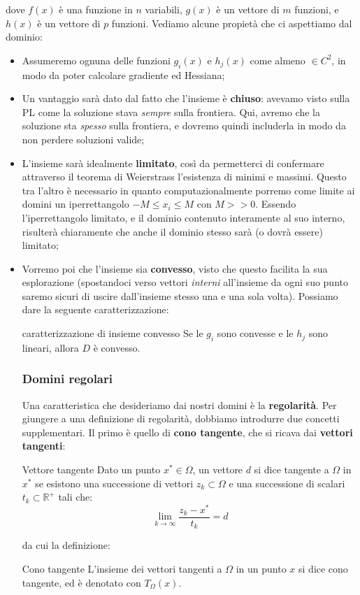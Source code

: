 \documentclass[a4paper,11pt]{article}
\begin{document}
dove $f(x)$ è una funzione in $n$ variabili, $g(x)$ è un vettore di $m$ funzioni, e $h(x)$ è un vettore di $p$ funzioni.
Vediamo alcune propietà che ci aspettiamo dal dominio:
\begin{itemize}
	\item Assumeremo ognuna delle funzioni $g_i(x)$ e $h_j(x)$ come almeno $\in C^2$, in modo da poter calcolare gradiente ed Hessiana;
	\item Un vantaggio sarà dato dal fatto che l'insieme è \textbf{chiuso}: avevamo visto sulla PL come la soluzione stava \textit{sempre} sulla frontiera. Qui, avremo che la soluzione sta \textit{spesso} sulla frontiera, e dovremo quindi includerla in modo da non perdere soluzioni valide;
	\item L'insieme sarà idealmente \textbf{limitato}, così da permetterci di confermare attraverso il teorema di Weierstrass l'esistenza di minimi e massimi.
Questo tra l'altro è necessario in quanto computazionalmente porremo come limite ai domini un iperrettangolo $-M \leq x_i \leq M$ con $M >> 0$.
Essendo l'iperrettangolo limitato, e il dominio contenuto interamente al suo interno, risulterà chiaramente che anche il dominio stesso sarà (o dovrà essere) limitato;
\item Vorremo poi che l'insieme sia \textbf{convesso}, visto che questo facilita la sua esplorazione (spostandoci verso vettori \textit{interni} all'insieme da ogni suo punto saremo sicuri di uscire dall'insieme stesso una e una sola volta).
	Possiamo dare la seguente caratterizzazione:
	\begin{theorem}{caratterizzazione di insieme convesso}
		Se le $g_i$ sono convesse e le $h_j$ sono lineari, allora $D$ è convesso.
	\end{theorem}

\subsubsection{Domini regolari}
Una caratteristica che desideriamo dai nostri domini è la \textbf{regolarità}.
Per giungere a una definizione di regolarità, dobbiamo introdurre due concetti supplementari.
Il primo è quello di \textbf{cono tangente}, che si ricava dai \textbf{vettori tangenti}:
\begin{definition}{Vettore tangente}
	Dato un punto $x^* \in \Omega$, un vettore $d$ si dice tangente a $\Omega$ in $x^*$ se esistono una successione di vettori $z_k \subset \Omega$ e una successione di scalari $t_k \subset \mathbb{R}^+$ tali che:
	$$
		\lim_{k \rightarrow \infty} \frac{z_k - x^*}{t_k} = d
	$$
\end{definition}
da cui la definizione:
\begin{definition}{Cono tangente}
	L'insieme dei vettori tangenti a $\Omega$ in un punto $x$ si dice cono tangente, ed è denotato con $T_\Omega(x)$.
\end{definition}


\end{itemize}
\end{document}
